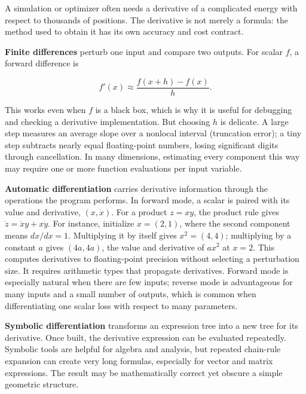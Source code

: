 A simulation or optimizer often needs a derivative of a complicated energy with respect to thousands of positions. The derivative is not merely a formula: the method used to obtain it has its own accuracy and cost contract.

\textbf{Finite differences} perturb one input and compare two outputs. For scalar \(f\), a forward difference is

\[
f'(x)\approx\frac{f(x+h)-f(x)}{h}.
\]

This works even when \(f\) is a black box, which is why it is useful for debugging and checking a derivative implementation. But choosing \(h\) is delicate. A large step measures an average slope over a nonlocal interval (truncation error); a tiny step subtracts nearly equal floating-point numbers, losing significant digits through cancellation. In many dimensions, estimating every component this way may require one or more function evaluations per input variable.

\textbf{Automatic differentiation} carries derivative information through the operations the program performs. In forward mode, a scalar is paired with its value and derivative, \((x,\dot x)\). For a product \(z=xy\), the product rule gives \(\dot z=\dot x y+x\dot y\). For instance, initialize \(x=(2,1)\), where the second component means \(dx/dx=1\). Multiplying it by itself gives \(x^2=(4,4)\); multiplying by a constant \(a\) gives \((4a,4a)\), the value and derivative of \(ax^2\) at \(x=2\). This computes derivatives to floating-point precision without selecting a perturbation size. It requires arithmetic types that propagate derivatives. Forward mode is especially natural when there are few inputs; reverse mode is advantageous for many inputs and a small number of outputs, which is common when differentiating one scalar loss with respect to many parameters.

\textbf{Symbolic differentiation} transforms an expression tree into a new tree for its derivative. Once built, the derivative expression can be evaluated repeatedly. Symbolic tools are helpful for algebra and analysis, but repeated chain-rule expansion can create very long formulas, especially for vector and matrix expressions. The result may be mathematically correct yet obscure a simple geometric structure.

